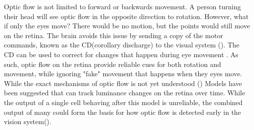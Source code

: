 \documentclass[11pt,a4paper,oneside,table,xcdraw]{article}
\begin{document}
Optic flow is not limited to forward or backwards movement. A person turning their head will see optic flow in the opposite direction to rotation. However, what if only the eyes move? There would be no motion, but the points would still move on the retina. The brain avoids this issue by sending a copy of the motor commands, known as the CD(corollary discharge) to the visual system (\cite{schcd}). The CD can be used to correct for changes that happen during eye movement \cite[p. 241-242]{coursebook}. As such, optic flow on the retina provide reliable cues for both rotation and movement, while ignoring "fake" movement that happens when they eyes move.\\
While the exact mechanisms of optic flow is not yet understood (\cite{opticalflowheading}) Models have been suggested that can track luminance changes on the retina over time. While the output of a single cell behaving after this model is unreliable, the combined output of many could form the basis for how optic flow is detected early in the vision system(\cite{schopticflow}).
\end{document}
